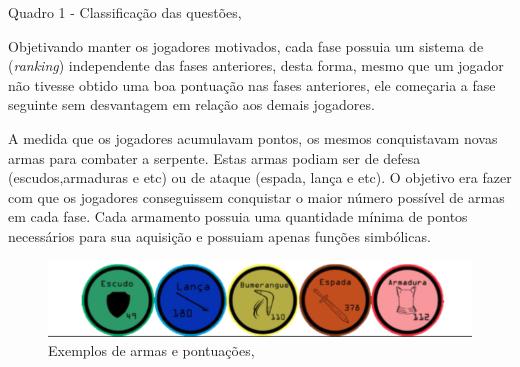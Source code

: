 \begin{table}[h]
	\centering
	\small{Quadro 1 - Classificação das questões, } 
\end{table}

\pagebreak
Objetivando manter os jogadores motivados, cada fase possuia um sistema de (\textit{ranking}{\itshape}) independente
das fases anteriores, desta forma, mesmo que um jogador não tivesse obtido uma boa pontuação nas fases anteriores, ele
começaria a fase seguinte sem desvantagem em relação aos demais jogadores. 

A medida que os jogadores acumulavam pontos, os mesmos conquistavam novas armas para combater a serpente. Estas armas podiam
ser de defesa (escudos,armaduras e etc) ou de ataque (espada, lança e etc). O objetivo era fazer com que os jogadores conseguissem conquistar
o maior número possível de armas em cada fase. Cada armamento possuia uma quantidade mínima de pontos necessários para sua
aquisição e possuiam apenas funções simbólicas.

\begin{figure}[h]
	\centering
	\includegraphics[keepaspectratio=true,scale=0.45]{figuras/armas.png}
	\caption{Exemplos de armas e pontuações, }
	\label{figura2}
\end{figure}

